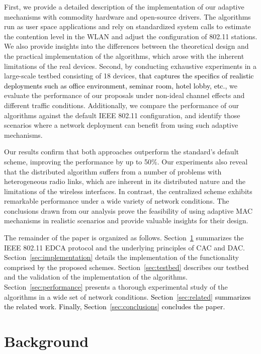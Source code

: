 \documentclass[a4paper,10pt]{article}
\newcommand{\revs}[1]{\textcolor{black}{#1}}
\begin{document}
First, we provide a detailed description of the implementation of our adaptive mechanisms with commodity hardware and open-source drivers. The algorithms run as user space applications and rely on standardized system calls to estimate the contention level in the WLAN and adjust the  configuration of 802.11 stations. 
We also provide insights into the differences between the theoretical design and the practical implementation of the algorithms, which arose with the inherent limitations of the real devices. 
Second, by conducting exhaustive experiments in a large-scale testbed consisting of 18 devices, \revs{that captures the specifics of realistic deployments such as office environment, seminar room, hotel lobby, etc.,} we evaluate the performance of our proposals under non-ideal channel effects and different traffic conditions. Additionally, we compare the performance of our algorithms against the default IEEE 802.11 configuration, and identify those scenarios where a network deployment can benefit from using such adaptive mechanisms.

Our results confirm that both approaches outperform the standard's default scheme, improving the performance by up to 50\%. Our experiments also reveal that the distributed algorithm suffers from a number of problems with heterogeneous radio links, which are inherent in its distributed nature and the limitations of the wireless interfaces. In contrast, the centralized scheme exhibits remarkable performance under a wide variety of network conditions. The conclusions drawn from our analysis prove the feasibility of using adaptive MAC mechanisms in realistic scenarios and provide valuable insights for their design.

The remainder of the paper is organized as follows. Section~\ref{sec:background} summarizes the IEEE 802.11 EDCA protocol and the underlying principles of CAC and DAC. Section~\ref{sec:implementation} details the implementation of the functionality comprised by the proposed schemes. Section~\ref{sec:testbed} describes our testbed and the validation of the implementation of the algorithms. Section~\ref{sec:performance} presents a thorough experimental study of the algorithms in a wide set of network conditions.  \revs{Section~\ref{sec:related} summarizes the related work. Finally, Section~\ref{sec:conclusions} concludes the paper.}


\section{Background}
\label{sec:background}
\end{document}
